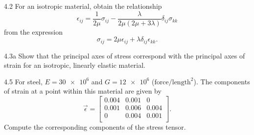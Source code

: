 
\begin{problem}{4.2}
  For an isotropic material, obtain the relationship
  \begin{equation*}
    \epsilon_{ij} = \frac{1}{2\mu} \sigma_{ij} - \frac{\lambda}{2\mu \left( 2\mu + 3\lambda \right)} \delta_{ij} \sigma_{kk}
  \end{equation*}
  from the expression
  \begin{equation*}
    \sigma_{ij} = 2\mu \epsilon_{ij} + \lambda\delta_{ij}\epsilon_{kk}
  .\end{equation*}
\end{problem}

\begin{problem}{4.3a}
  Show that the principal axes of stress correspond with the principal axes of strain for an isotropic, linearly elastic material.
\end{problem}

\begin{problem}{4.5}
  For steel, $E = \num{30e6}$ and $G = \num{12e6}$ ($\text{force}/\text{length}^2$).
  The components of strain at a point within this material are given by
  \begin{equation*}
    \Vec{\epsilon} = \begin{bmatrix}
      \num{0,004}  & \num{0,001}  & 0\\
    \num{0,001}  & \num{0,006}  & \num{0,004} \\
    0 & \num{0,004}  & \num{0,001} \\
    \end{bmatrix}
  .\end{equation*}
  Compute the corresponding components of the stress tensor.
\end{problem}
